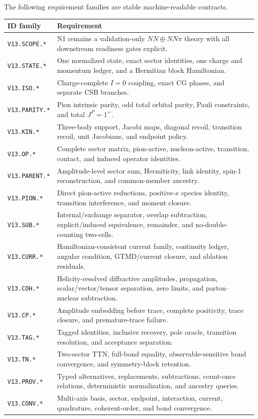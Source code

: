 \documentclass[11pt]{article}
\begin{document}
The following requirement families are stable machine-readable contracts.
\begin{longtable}{L{0.16\textwidth}L{0.76\textwidth}}
\toprule
ID family & Requirement\\
\midrule
\endhead
\texttt{V13.SCOPE.*} & N1 remains a validation-only \(NN\oplus NN\pi\) theory
with all downstream readiness gates explicit.\\
\texttt{V13.STATE.*} & One normalized state, exact sector identities, one
charge and momentum ledger, and a Hermitian block Hamiltonian.\\
\texttt{V13.ISO.*} & Charge-complete \(I=0\) coupling, exact CG phases, and
separate CSB branches.\\
\texttt{V13.PARITY.*} & Pion intrinsic parity, odd total orbital parity, Pauli
constraints, and total \(J^P=1^+\).\\
\texttt{V13.KIN.*} & Three-body support, Jacobi maps, diagonal recoil,
transition recoil, unit Jacobians, and endpoint policy.\\
\texttt{V13.OP.*} & Complete sector matrix, pion-active, nucleon-active,
transition, contact, and induced operator identities.\\
\texttt{V13.PARENT.*} & Amplitude-level sector sum, Hermiticity, link identity,
spin-1 reconstruction, and common-member ancestry.\\
\texttt{V13.PION.*} & Direct pion-active reductions, positive-\(x\) species
identity, transition interference, and moment closure.\\
\texttt{V13.SUB.*} & Internal/exchange separator, overlap subtraction,
explicit/induced equivalence, remainder, and no-double-counting two-cells.\\
\texttt{V13.CURR.*} & Hamiltonian-consistent current family, continuity ledger,
angular condition, GTMD/current closure, and ablation residuals.\\
\texttt{V13.COH.*} & Helicity-resolved diffractive amplitudes, propagation,
scalar/vector/tensor separation, zero limits, and parton--nuclear subtraction.\\
\texttt{V13.CP.*} & Amplitude embedding before trace, complete positivity,
trace closure, and premature-trace failure.\\
\texttt{V13.TAG.*} & Tagged identities, inclusive recovery, pole oracle,
transition resolution, and acceptance separation.\\
\texttt{V13.TN.*} & Two-sector TTN, full-bond equality, observable-sensitive
bond convergence, and symmetry-block retention.\\
\texttt{V13.PROV.*} & Typed alternatives, replacements, subtractions,
count-once relations, deterministic normalization, and ancestry queries.\\
\texttt{V13.CONV.*} & Multi-axis basis, sector, endpoint, interaction, current,
quadrature, coherent-order, and bond convergence.\\
\bottomrule
\end{longtable}
\end{document}
